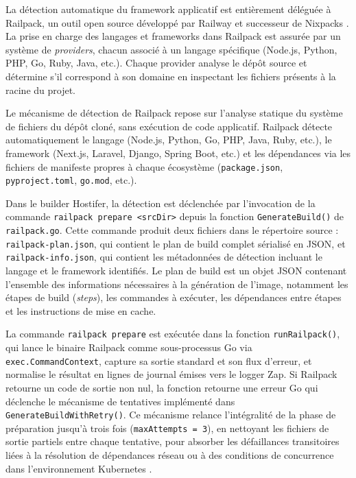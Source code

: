 La détection automatique du framework applicatif est entièrement déléguée à Railpack, un outil open source développé par Railway et successeur de Nixpacks \cite{railpack-github}. La prise en charge des langages et frameworks dans Railpack est assurée par un système de \textit{providers}, chacun associé à un langage spécifique (Node.js, Python, PHP, Go, Ruby, Java, etc.).  Chaque provider analyse le dépôt source et détermine s'il correspond à son domaine en inspectant les fichiers présents à la racine du projet. 

Le mécanisme de détection de Railpack repose sur l'analyse statique du système de fichiers du dépôt cloné, sans exécution de code applicatif. Railpack détecte automatiquement le langage (Node.js, Python, Go, PHP, Java, Ruby, etc.), le framework (Next.js, Laravel, Django, Spring Boot, etc.) et les dépendances via les fichiers de manifeste propres à chaque écosystème (\texttt{package.json}, \texttt{pyproject.toml}, \texttt{go.mod}, etc.). 

Dans le builder Hostifer, la détection est déclenchée par l'invocation de la commande \texttt{railpack prepare <srcDir>} depuis la fonction \texttt{GenerateBuild()} de \texttt{railpack.go}. Cette commande produit deux fichiers dans le répertoire source : \texttt{railpack-plan.json}, qui contient le plan de build complet sérialisé en JSON, et \texttt{railpack-info.json}, qui contient les métadonnées de détection incluant le langage et le framework identifiés. Le plan de build est un objet JSON contenant l'ensemble des informations nécessaires à la génération de l'image, notamment les étapes de build (\textit{steps}), les commandes à exécuter, les dépendances entre étapes et les instructions de mise en cache. 

La commande \texttt{railpack prepare} est exécutée dans la fonction \texttt{runRailpack()}, qui lance le binaire Railpack comme sous-processus Go via \texttt{exec.CommandContext}, capture sa sortie standard et son flux d'erreur, et normalise le résultat en lignes de journal émises vers le logger Zap. Si Railpack retourne un code de sortie non nul, la fonction retourne une erreur Go qui déclenche le mécanisme de tentatives implémenté dans \texttt{GenerateBuildWithRetry()}. Ce mécanisme relance l'intégralité de la phase de préparation jusqu'à trois fois (\texttt{maxAttempts = 3}), en nettoyant les fichiers de sortie partiels entre chaque tentative, pour absorber les défaillances transitoires liées à la résolution de dépendances réseau ou à des conditions de concurrence dans l'environnement Kubernetes \cite{railpack-github}.

